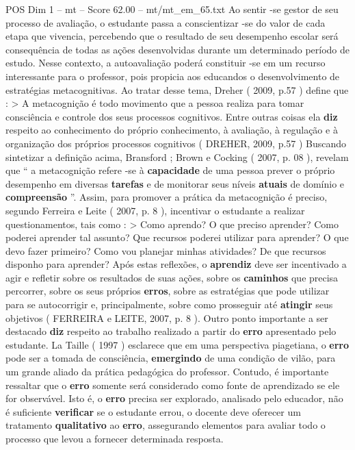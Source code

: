 \begin{textsample}{POS Dim 1 – mt – Score 62.00 – mt/mt\_em\_65.txt}
Ao sentir -se gestor de seu processo de avaliação, o estudante passa a conscientizar -se do valor de cada etapa que vivencia, percebendo que o resultado de seu desempenho escolar será consequência de todas as ações desenvolvidas durante um determinado período de estudo.
Nesse contexto, a autoavaliação poderá constituir -se em um recurso interessante para o professor, pois propicia aos educandos o desenvolvimento de estratégias metacognitivas.
Ao tratar desse tema, Dreher ( 2009, p.57 ) define que : > A metacognição é todo movimento que a pessoa realiza para tomar consciência e controle dos seus processos cognitivos.
Entre outras coisas ela \textbf{diz} respeito ao conhecimento do próprio conhecimento, à avaliação, à regulação e à organização dos próprios processos cognitivos ( DREHER, 2009, p.57 ) Buscando sintetizar a definição acima, Bransford ; Brown e Cocking ( 2007, p. 08 ), revelam que “ a metacognição refere -se à \textbf{capacidade} de uma pessoa prever o próprio desempenho em diversas \textbf{tarefas} e de monitorar seus níveis \textbf{atuais} de domínio e \textbf{compreensão} ”.
Assim, para promover a prática da metacognição é preciso, segundo Ferreira e Leite ( 2007, p. 8 ), incentivar o estudante a realizar questionamentos, tais como : > Como aprendo?
O que preciso aprender?
Como poderei aprender tal assunto?
Que recursos poderei utilizar para aprender?
O que devo fazer primeiro?
Como vou planejar minhas atividades?
De que recursos disponho para aprender?
Após estas reflexões, o \textbf{aprendiz} deve ser incentivado a agir e refletir sobre os resultados de suas ações, sobre os \textbf{caminhos} que precisa percorrer, sobre os seus próprios \textbf{erros}, sobre as estratégias que pode utilizar para se autocorrigir e, principalmente, sobre como prosseguir até \textbf{atingir} seus objetivos ( FERREIRA e LEITE, 2007, p. 8 ).
Outro ponto importante a ser destacado \textbf{diz} respeito ao trabalho realizado a partir do \textbf{erro} apresentado pelo estudante.
La Taille ( 1997 ) esclarece que em uma perspectiva piagetiana, o \textbf{erro} pode ser a tomada de consciência, \textbf{emergindo} de uma condição de vilão, para um grande aliado da prática pedagógica do professor.
Contudo, é importante ressaltar que o \textbf{erro} somente será considerado como fonte de aprendizado se ele for observável.
Isto é, o \textbf{erro} precisa ser explorado, analisado pelo educador, não é suficiente \textbf{verificar} se o estudante errou, o docente deve oferecer um tratamento \textbf{qualitativo} ao \textbf{erro}, assegurando elementos para avaliar todo o processo que levou a fornecer determinada resposta.

\end{textsample}
